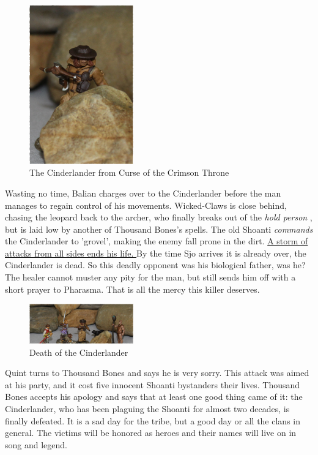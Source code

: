 \begin{figure}[h]
	\centering
	\includegraphics[width=0.4\textwidth]{images/The-Cinderlander-from-Curse-of-the-Crimson-Throne-603327133_mod.jpg}
	\caption{The Cinderlander from Curse of the Crimson Throne}
	\label{fig:The-Cinderlander-from-Curse-of-the-Crimson-Throne-603327133}
\end{figure}

Wasting no time, Balian charges over to the Cinderlander before the man manages to regain control of his movements. Wicked-Claws is close behind, chasing the leopard back to the archer, who finally breaks out of the {\itshape hold person} , but is laid low by another of Thousand Bones's spells. The old Shoanti  {\itshape commands} the Cinderlander to 'grovel', making the enemy fall prone in the dirt. \hyperref[fig:Death-of-the-Cinderlander-603327730]{ A storm of attacks from all sides ends his life. } By the time Sjo arrives it is already over, the Cinderlander is dead. So this deadly opponent was his biological father, was he? The healer cannot muster any pity for the man, but still sends him off with a short prayer to Pharasma. That is all the mercy this killer deserves. \\

\begin{figure}[h]
	\centering
	\includegraphics[width=0.4\textwidth]{images/Death-of-the-Cinderlander-603327730_mod.jpg}
	\caption{Death of the Cinderlander}
	\label{fig:Death-of-the-Cinderlander-603327730}
\end{figure}

Quint turns to Thousand Bones and says he is very sorry. This attack was aimed at his party, and it cost five innocent Shoanti bystanders their lives. Thousand Bones accepts his apology and says that at least one good thing came of it: the Cinderlander, who has been plaguing the Shoanti for almost two decades, is finally defeated. It is a sad day for the tribe, but a good day or all the clans in general. The victims will be honored as heroes and their names will live on in song and legend.\\

